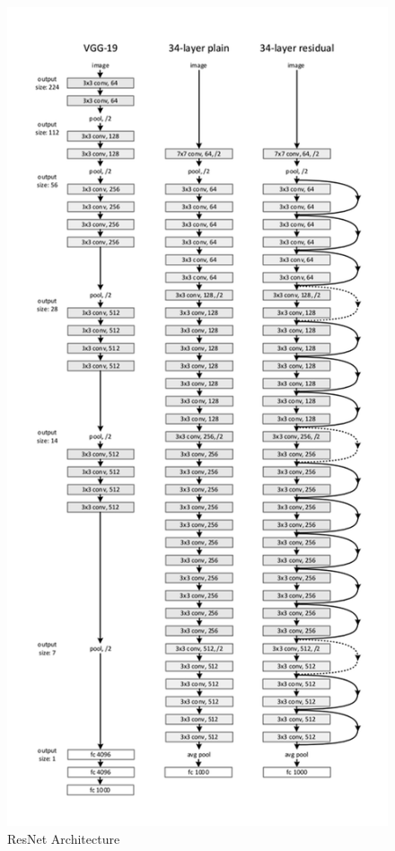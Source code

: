         \begin{figure}[hbt!]
            \centering
                \includegraphics[height=1.4\textwidth]{./img/ResNetArc.jpg}
                \caption{ResNet Architecture}
        \end{figure}

